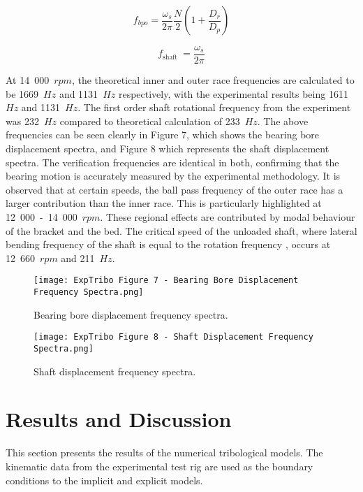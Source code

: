 \begin{equation}\label{ball pass frequency outer}
	f_{b p o}=\frac{\omega_s}{2 \pi} \frac{N}{2}\left(1+\frac{D_r}{D_p}\right)
\end{equation}

\begin{equation}\label{ball pass frequency shaft}
	f_{\text {shaft }}=\frac{\omega_s}{2 \pi}
\end{equation}

At 14~000~$rpm$, the theoretical inner and outer race frequencies are calculated to be 1669~$Hz$ and 1131~$Hz$ respectively, with the experimental results being 1611~$Hz$ and 1131~$Hz$. The first order shaft rotational frequency from the experiment was 232~$Hz$ compared to theoretical calculation of 233~$Hz$. The above frequencies can be seen clearly in Figure 7, which shows the bearing bore displacement spectra, and Figure 8 which represents the shaft displacement spectra. The verification frequencies are identical in both, confirming that the bearing motion is accurately measured by the experimental methodology. It is observed that at certain speeds, the ball pass frequency of the outer race has a larger contribution than the inner race. This is particularly highlighted at 12~000~-~14~000~$rpm$. These regional effects are contributed by modal behaviour of the bracket and the bed. The critical speed of the unloaded shaft, where lateral bending frequency of the shaft is equal to the rotation frequency \cite{Shigley'sMechanicalEngineeringDesign}, occurs at 12~660~$rpm$ and 211~$Hz$.

\begin{figure}
	\centering
	\texttt{[image: ExpTribo Figure 7 - Bearing Bore Displacement Frequency Spectra.png]}
	\caption{Bearing bore displacement frequency spectra.}
	\label{Bearing bore displacement frequency spectra}
\end{figure}

\begin{figure}
	\centering
	\texttt{[image: ExpTribo Figure 8 - Shaft Displacement Frequency Spectra.png]}
	\caption{Shaft displacement frequency spectra.}
	\label{Shaft displacement frequency spectra}
\end{figure}

\section{Results and Discussion}
This section presents the results of the numerical tribological models. The kinematic data from the experimental test rig are used as the boundary conditions to the implicit and explicit models.

